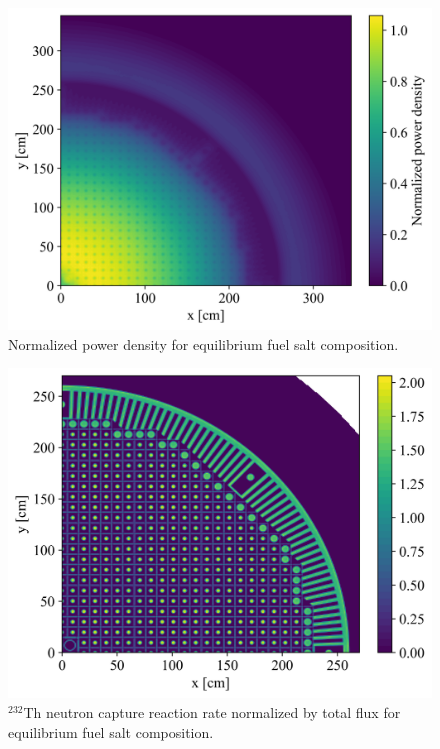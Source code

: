 \documentclass{article}
\begin{document}
\begin{figure}[ht!] %
  \includegraphics[width=\textwidth]{power_distribution_eq.png}
  \caption{Normalized power density for equilibrium fuel salt
  composition.}
  \label{fig:pow_den}
\end{figure}
\begin{figure}[ht!] %
  \includegraphics[width=\textwidth]{breeding_distribution_eq.png}
  \caption{$^{232}$Th neutron capture reaction rate normalized by total flux
  for equilibrium fuel salt composition.}
  \label{fig:breeding_den}
\end{figure}
\end{document}
